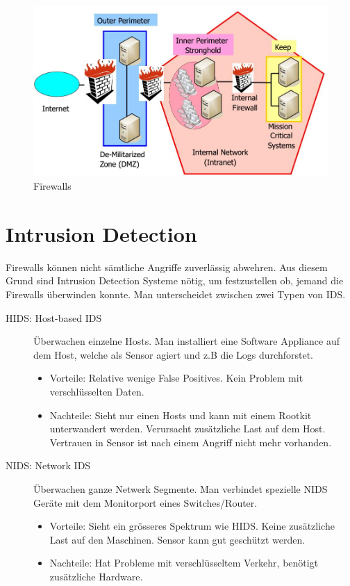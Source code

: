 \begin{figure}[h]
\centering
\includegraphics[width=0.7\linewidth]{images/firewall}
\caption{Firewalls}
\label{fig:firewall}
\end{figure}

\section{Intrusion Detection}
Firewalls können nicht sämtliche Angriffe zuverlässig abwehren. Aus diesem Grund sind Intrusion Detection Systeme nötig, um festzustellen ob, jemand die Firewalls überwinden konnte. Man unterscheidet zwischen zwei Typen von IDS.
\begin{description}
	\item[HIDS: Host-based IDS] Überwachen einzelne Hosts. Man installiert eine Software Appliance auf dem Host, welche als Sensor agiert und z.B die Logs durchforstet.
	\begin{itemize}
		\item Vorteile: Relative wenige False Positives. Kein Problem mit verschlüsselten Daten. 
		\item Nachteile: Sieht nur einen Hosts und kann mit einem Rootkit unterwandert werden. Verursacht zusätzliche Last auf dem Host. Vertrauen in Sensor ist nach einem Angriff nicht mehr vorhanden.
	\end{itemize}
	\item[NIDS: Network IDS] Überwachen ganze Netwerk Segmente. Man verbindet spezielle NIDS Geräte mit dem Monitorport eines Switches/Router.
	\begin{itemize}
		\item Vorteile: Sieht ein grösseres Spektrum wie HIDS. Keine zusätzliche Last auf den Maschinen. Sensor kann gut geschützt werden.
		\item Nachteile: Hat Probleme mit verschlüsseltem Verkehr, benötigt zusätzliche Hardware. 
	\end{itemize}
\end{description}

